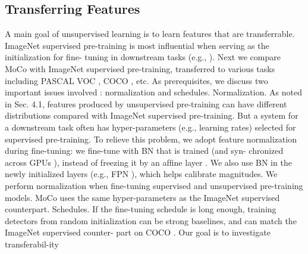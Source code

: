 \documentclass[10pt,twocolumn]{article}  %
\begin{document}
\subsection{Transferring Features}
A main goal of unsupervised learning is to learn features
that are transferrable. ImageNet supervised pre-training is
most inﬂuential when serving as the initialization for ﬁne-
tuning in downstream tasks (e.g., \cite{21_girshick2014rich,20_girshick2015fast, 43_long2015fully, 52_ren2015faster}). Next
we compare MoCo with ImageNet supervised pre-training,
transferred to various tasks including PASCAL VOC \cite{18_everingham2010pascal},
COCO \cite{42_lin2014microsoft}, etc. As prerequisites, we discuss two important
issues involved \cite{31_he2019rethinking}: normalization and schedules.
Normalization. As noted in Sec. 4.1, features produced by
unsupervised pre-training can have different distributions
compared with ImageNet supervised pre-training. But a
system for a downstream task often has hyper-parameters
(e.g., learning rates) selected for supervised pre-training. To
relieve this problem, we adopt feature normalization during
ﬁne-tuning: we ﬁne-tune with BN that is trained (and syn-
chronized across GPUs \cite{49_peng2018megdet}), instead of freezing it by an
afﬁne layer \cite{33_he2016deep}. We also use BN in the newly initialized
layers (e.g., FPN \cite{41_lin2017feature}), which helps calibrate magnitudes.
We perform normalization when ﬁne-tuning supervised
and unsupervised pre-training models. MoCo uses the same
hyper-parameters as the ImageNet supervised counterpart.
Schedules. If the ﬁne-tuning schedule is long enough,
training detectors from random initialization can be strong
baselines, and can match the ImageNet supervised counter-
part on COCO \cite{31_he2019rethinking}. Our goal is to investigate transferabil-ity
\end{document}
